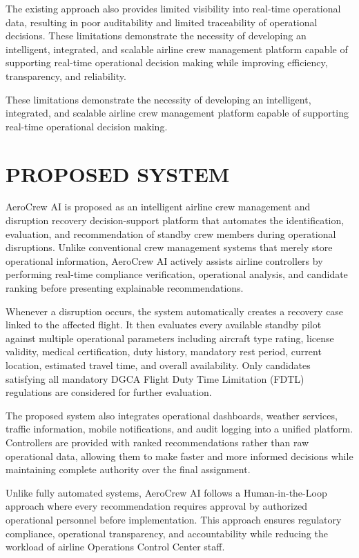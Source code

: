 \documentclass[12pt,a4paper]{report}
\begin{document}
The existing approach also provides limited visibility into real-time operational data, resulting in poor auditability and limited traceability of operational decisions. These limitations demonstrate the necessity of developing an intelligent, integrated, and scalable airline crew management platform capable of supporting real-time operational decision making while improving efficiency, transparency, and reliability.

These limitations demonstrate the necessity of developing an intelligent, integrated, and scalable airline crew management platform capable of supporting real-time operational decision making.

\section{PROPOSED SYSTEM}

AeroCrew AI is proposed as an intelligent airline crew management and disruption recovery decision-support platform that automates the identification, evaluation, and recommendation of standby crew members during operational disruptions. Unlike conventional crew management systems that merely store operational information, AeroCrew AI actively assists airline controllers by performing real-time compliance verification, operational analysis, and candidate ranking before presenting explainable recommendations.

Whenever a disruption occurs, the system automatically creates a recovery case linked to the affected flight. It then evaluates every available standby pilot against multiple operational parameters including aircraft type rating, license validity, medical certification, duty history, mandatory rest period, current location, estimated travel time, and overall availability. Only candidates satisfying all mandatory DGCA Flight Duty Time Limitation (FDTL) regulations are considered for further evaluation.

The proposed system also integrates operational dashboards, weather services, traffic information, mobile notifications, and audit logging into a unified platform. Controllers are provided with ranked recommendations rather than raw operational data, allowing them to make faster and more informed decisions while maintaining complete authority over the final assignment.

Unlike fully automated systems, AeroCrew AI follows a Human-in-the-Loop approach where every recommendation requires approval by authorized operational personnel before implementation. This approach ensures regulatory compliance, operational transparency, and accountability while reducing the workload of airline Operations Control Center staff.
\end{document}
